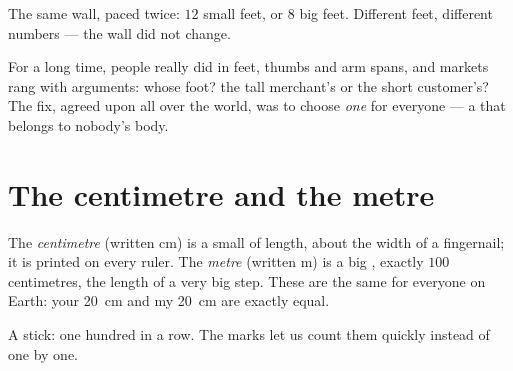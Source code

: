 \begin{omfigure}

{\small The same wall, paced twice: $12$ small feet, or $8$ big feet.
Different feet, different numbers --- the wall did not change.}
\end{omfigure}

\begin{remark}\label{rem:g2:measuring-length:argument}
For a long time, people really did  in feet, thumbs and arm
spans, and markets rang with arguments: whose foot? the tall
merchant's or the short customer's? The fix, agreed upon all over the
world, was to choose \emph{one}  for everyone --- a  that
belongs to nobody's body.
\end{remark}

\section{The centimetre and the metre}

\begin{definition}\label{def:g2:measuring-length:units}
The \emph{centimetre} (written \unit{cm}) is a
small  of length, about the width of a fingernail; it is printed
on every ruler. The \emph{metre} (written \unit{m}) is a
big , exactly $100$ centimetres, the length of a very big step.
These  are the same for everyone on Earth: your
\qty{20}{cm} and my \qty{20}{cm} are exactly equal.
\end{definition}

\begin{omfigure}

{\small A  stick: one hundred  in a row. The marks
let us count them quickly instead of one by one.}
\end{omfigure}

